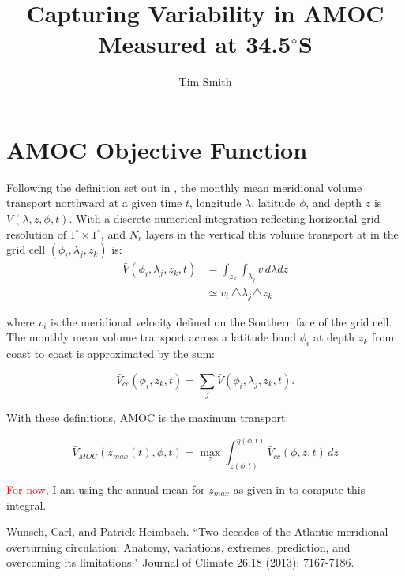\documentclass[a4paper,11pt]{article}
\title{\vspace{-5ex}Capturing Variability in AMOC \\ Measured at 34.5$^\circ$S}
\author{Tim Smith}
\date{\vspace{-3ex}}
\newcommand{\red}[1]{\textcolor{red}{#1}}
\begin{document}
\maketitle

\begin{abstract}
  
\end{abstract}

\section{AMOC Objective Function}

  Following the definition set out in \cite{wunschAndHeimbach_AMOC}, the monthly mean meridional volume transport northward at a given time $t$, longitude $\lambda$, latitude $\phi$, and depth $z$ is $\bar{V}(\lambda,z,\phi,t)$. With a discrete numerical integration reflecting horizontal grid resolution of $1^{\circ} \times 1^{\circ}$, and $N_r$ layers in the vertical this volume transport at in the grid cell $(\phi_i,\lambda_j,z_k)$ is: 
  \begin{align}
    \bar{V}(\phi_i,\lambda_j,z_k,t) &= \int_{z_k}\int_{\lambda_j}v \,d\lambda dz \\
				    &\simeq v_i \,  \triangle \lambda_j \triangle z_k
    \label{eq:volTrans}
  \end{align}
  
  where $v_i$ is the meridional velocity defined on the Southern face of the grid cell. The monthly mean volume transport across a latitude band $\phi_i$ at depth $z_k$ from coast to coast is approximated by the sum: 
  
  \begin{equation}
    \bar{V}_{cc}(\phi_i,z_k,t) = \sum_{j}\bar{V}(\phi_i,\lambda_j,z_k,t) .
    \label{eq:vcc}
  \end{equation}

  With these definitions, AMOC is the maximum transport: 
  
  \begin{equation}
    \bar{V}_{MOC}(z_{max}(t),\phi,t) = \max_z\int_{z(\phi,t)}^{\eta(\phi,t)}\bar{V}_{cc}(\phi,z,t) \, dz
    \label{eq:amoc}
  \end{equation}

  \red{For now}, I am using the annual mean for $z_{max}$ as given in \cite{wunschAndHeimbach_AMOC} to compute this integral.   

  
\begin{thebibliography}{3}

  Wunsch, Carl, and Patrick Heimbach. ``Two decades of the Atlantic meridional overturning circulation: Anatomy, variations, extremes, prediction, and overcoming its limitations." Journal of Climate 26.18 (2013): 7167-7186.

\end{thebibliography}
\end{document}
